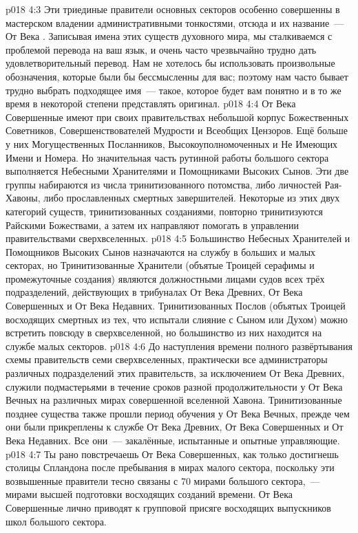 \vs p018 4:3 \pc Эти триединые правители основных секторов особенно совершенны в мастерском владении административными тонкостями, отсюда и их название~--- От Века . Записывая имена этих существ духовного мира, мы сталкиваемся с проблемой перевода на ваш язык, и очень часто чрезвычайно трудно дать удовлетворительный перевод. Нам не хотелось бы использовать произвольные обозначения, которые были бы бессмысленны для вас; поэтому нам часто бывает трудно выбрать подходящее имя~--- такое, которое будет вам понятно и в то же время в некоторой степени представлять оригинал.
\vs p018 4:4 \pc От Века Совершенные имеют при своих правительствах небольшой корпус Божественных Советников, Совершенствователей Мудрости и Всеобщих Цензоров. Ещё больше у них Могущественных Посланников, Высокоуполномоченных и Не Имеющих Имени и Номера. Но значительная часть рутинной работы большого сектора выполняется Небесными Хранителями и Помощниками Высоких Сынов. Эти две группы набираются из числа тринитизованного потомства, либо личностей Рая\hyp{}Хавоны, либо прославленных смертных завершителей. Некоторые из этих двух категорий существ, тринитизованных созданиями, повторно тринитизуются Райскими Божествами, а затем их направляют помогать в управлении правительствами сверхвселенных.
\vs p018 4:5 Большинство Небесных Хранителей и Помощников Высоких Сынов назначаются на службу в больших и малых секторах, но Тринитизованные Хранители (объятые Троицей серафимы и промежуточные создания) являются должностными лицами судов всех трёх подразделений, действующих в трибуналах От Века Древних, От Века Совершенных и От Века Недавних. Тринитизованных Послов (объятых Троицей восходящих смертных из тех, что испытали слияние с Сыном или Духом) можно встретить повсюду в сверхвселенной, но большинство из них находится на службе малых секторов.
\vs p018 4:6 До наступления времени полного развёртывания схемы правительств семи сверхвселенных, практически все администраторы различных подразделений этих правительств, за исключением От Века Древних, служили подмастерьями в течение сроков разной продолжительности у От Века Вечных на различных мирах совершенной вселенной Хавона. Тринитизованные позднее существа также прошли период обучения у От Века Вечных, прежде чем они были прикреплены к службе От Века Древних, От Века Совершенных и От Века Недавних. Все они~--- закалённые, испытанные и опытные управляющие.
\vs p018 4:7 \pc Ты рано повстречаешь От Века Совершенных, как только достигнешь столицы Спландона после пребывания в мирах малого сектора, поскольку эти возвышенные правители тесно связаны с 70 мирами большого сектора,~--- мирами высшей подготовки восходящих созданий времени. От Века Совершенные лично приводят к групповой присяге восходящих выпускников школ большого сектора.
